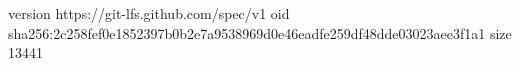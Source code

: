 version https://git-lfs.github.com/spec/v1
oid sha256:2c258fef0e1852397b0b2e7a9538969d0e46eadfe259df48dde03023aee3f1a1
size 13441
